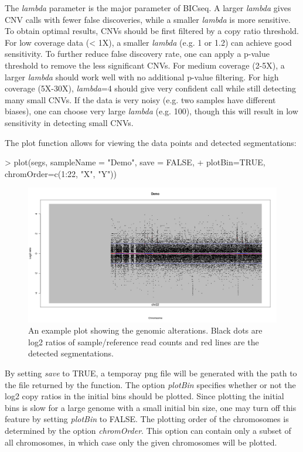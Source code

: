 \documentclass[12pt]{article}
\begin{document}
The \textit{lambda} parameter is the major parameter of BICseq. A larger \textit{lambda} gives CNV calls with fewer false discoveries, 
while a smaller \textit{lambda} is more sensitive. To obtain optimal results, CNVs should be first filtered by a copy ratio threshold.
For low coverage data (< 1X), a smaller \textit{lambda} (e.g. 1 or 1.2) can achieve good sensitivity. 
To further reduce false discovery rate, one can apply a p-value threshold to remove the less significant CNVs.
For medium coverage (2-5X), a larger \textit{lambda} should work well with no additional p-value filtering.
For high coverage (5X-30X), \textit{lambda}=4 should give very confident call while still detecting many small CNVs. If the data is very noisy 
(e.g. two samples have different biases), one can choose very large \textit{lambda} (e.g. 100), 
though this will result in low sensitivity in detecting small CNVs.

The plot function allows for viewing the data points and detected segmentations:

\begin{Schunk}
\begin{Sinput}
> plot(segs, sampleName = "Demo", save = FALSE, 
+     plotBin=TRUE, chromOrder=c(1:22, "X", "Y"))
\end{Sinput}
\end{Schunk}

\begin{figure}[htbp]
  \begin{center}
    \includegraphics[scale=0.5]{fig01}
    \caption{An example plot showing the genomic alterations.
    Black dots are log2 ratios of sample/reference read counts and red lines are the detected segmentations.}
  \end{center}
\end{figure}

By setting \textit{save} to TRUE, a temporay png file will be generated with the path 
to the file returned by the function. 
The option \textit{plotBin} specifies whether or not the log2 copy ratios in the initial bins should be plotted. 
Since plotting the initial bins is slow for a large genome with a small initial bin size, one may turn off this feature by setting \textit{plotBin} to FALSE.
The plotting order of the chromosomes is determined by the option \textit{chromOrder}. 
This option can contain only a subset of all chromosomes, in which case only the given chromosomes will be plotted.
\end{document}
